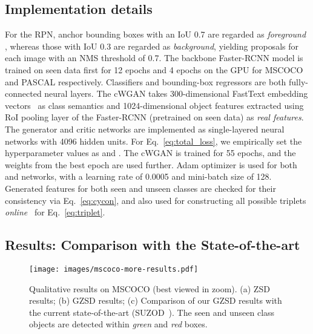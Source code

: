 \documentclass{bmvc2k}
\begin{document}
\subsection{Implementation details}
\label{sec:zsd1-imple}
For the RPN, anchor bounding boxes with an IoU  0.7 are regarded as \textit{foreground} , whereas those with IoU  0.3 are regarded as \textit{background}, yielding  proposals for each image with an NMS threshold of 0.7. The backbone Faster-RCNN model is trained on seen data first for 12 epochs and 4 epochs on the GPU for MSCOCO and PASCAL respectively. Classifiers and bounding-box regressors are both fully-connected neural layers. The cWGAN takes 300-dimensional FastText embedding vectors~\cite{joulin-etal-2017-bag} as class semantics and 1024-dimensional object features extracted using RoI pooling layer of the Faster-RCNN (pretrained on seen data) as {\em real features}. The generator and critic networks are implemented as single-layered neural networks with 4096 hidden units. For Eq.~\ref{eq:total_loss}, we empirically set the hyperparameter values as  and . 
The cWGAN is trained for 55 epochs, and the weights from the best epoch are used further. Adam optimizer is used for both  and  networks, with a learning rate of 0.0005 and mini-batch size of 128. Generated features for both seen and unseen classes are checked for their consistency via Eq.~\ref{eq:cycon}, and also used for constructing all possible triplets {\em online}~\cite{schroff2015facenet} for Eq.~\ref{eq:triplet}.



\subsection{Results: Comparison with the State-of-the-art}
\label{sec:results}


\begin{figure}[t]
	\centering
	\texttt{[image: images/mscoco-more-results.pdf]}
	\caption{Qualitative results on MSCOCO (best viewed in zoom). (a) ZSD results; (b) GZSD results; (c) Comparison of our GZSD results with the current state-of-the-art (SUZOD~\cite{hayat2020synthesizing}). The seen and unseen class objects are detected within {\em green} and {\em red} boxes.}
	\label{fig:mscoco-results}
\end{figure}  
\end{document}

